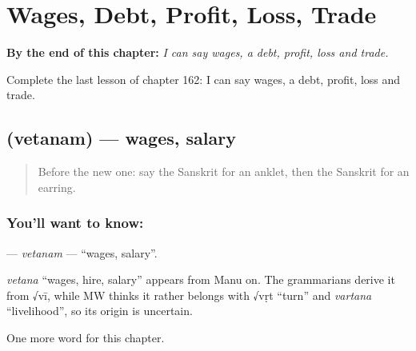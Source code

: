
\chapter{Wages, Debt, Profit, Loss, Trade}
\label{ch:sa-wages-debt-profit-loss-trade}

\begin{chapteropening}
\textbf{By the end of this chapter:} \emph{I can say wages, a debt, profit, loss and trade.}

Complete the last lesson of chapter 162: I can say wages, a debt, profit, loss and trade.
\end{chapteropening}

\section[\texorpdfstring{\sk{वेतनम्} (vetanam)}{वेतनम् (vetanam)}]{ (vetanam) — wages, salary}

\label{lesson:SA-C162-vetanam}



\begin{quote}
Before the new one: say the Sanskrit for an anklet, then the Sanskrit for an earring.
\end{quote}

\subsection*{You'll want to know: }
\textbf{} — \emph{vetanam} — \textquotedblleft{}wages, salary\textquotedblright{}.

\begin{cousinweb}
\emph{vetana} \textquotedblleft{}wages, hire, salary\textquotedblright{} appears from Manu on. The grammarians derive it from √vī, while MW thinks it rather belongs with √vṛt \textquotedblleft{}turn\textquotedblright{} and \emph{vartana} \textquotedblleft{}livelihood\textquotedblright{}, so its origin is uncertain.
\end{cousinweb}

\begin{grammarlens}[title={What you've built}]
One more word for this chapter.
\end{grammarlens}

